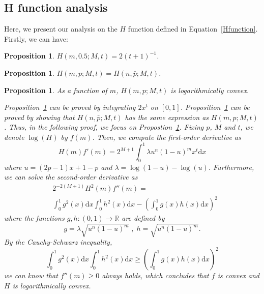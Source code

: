 \documentclass{article}
\makeatletter
\newtheorem{proposition}[theorem]{Proposition}
\renewenvironment{proof}[1][\proofname]{\par
  \vspace{-\topsep}%
  \pushQED{\qed}%
  \normalfont
  \topsep0pt \partopsep0pt %
  \trivlist
  \item[\hskip\labelsep
        \itshape
    #1\@addpunct{.}]\ignorespaces
}{%
  \popQED\endtrivlist\@endpefalse
  \addvspace{0pt plus 0pt} %
}
\makeatother
\begin{document}
\subsection{H function analysis}
\label{HFunSec}
Here, we present our analysis on the $H$ function defined in Equation~\ref{Hfunction}.
Firstly, we can have:
\begin{proposition}
\label{MidPoint}
$H(m,0.5;M,t) = 2(t+1)^{-1}$.
\end{proposition}
\begin{proposition}
\label{Symmetry}
$H(m,p;M,t) = H(n, \bar{p};M,t)$.
\end{proposition}
\begin{proposition}
\label{LogConvexity}
As a function of $m$, $H(m,p;M,t)$ is logarithmically convex.
\begin{proof}
Proposition~\ref{MidPoint} can be proved by integrating $2 x^t$ on $[0,1]$.
Proposition~\ref{Symmetry} can be proved by showing that $H(n, \bar{p};M,t)$ has the same expression as $H(m,p;M,t)$.
Thus, in the following proof, we focus on Propostion~\ref{LogConvexity}. Fixing $p$, $M$ and $t$, we denote $\log (H)$ by $f(m)$. Then, we compute the first-order derivative as
\begin{equation}
H(m)f'(m)=2^{M+1}\int_{0}^{1}\lambda u^{n}(1-u)^{m}x^t\mathrm{d}x
\end{equation}
where $u= (2p-1)x+1-p$ and $\lambda=\log(1-u)-\log(u)$. Furthermore, we can solve the second-order derivative as
\begin{equation}
\begin{split}
&2^{-2(M+1)}H^2(m)f''(m)=\\
&\int_{0}^{1}g^2(x)\mathrm{d}x\int_{0}^{1}h^2(x)\mathrm{d}x-\left(\int_{0}^{1}g(x)h(x)\mathrm{d}x\right)^2
\end{split}
\end{equation}
where the functions $g,h:(0,1)\rightarrow  \mathbb{R}$ are defined by
\begin{equation}
g=\lambda\sqrt{u^{n}(1-u)^{m}}\;, \; h = \sqrt{u^{n}(1-u)^{m}}.
\end{equation}
By the Cauchy-Schwarz inequality,
\begin{equation}
\int_{0}^{1}g^2(x)\mathrm{d}x\int_{0}^{1}h^2(x)\mathrm{d}x\geq \left(\int_{0}^{1}g(x)h(x)\mathrm{d}x\right)^2
\end{equation}
we can know that $f''(m)\geq 0$ always holds, which concludes that $f$ is convex and $H$ is logarithmically convex.
\end{proof}
\end{proposition}
\end{document}
